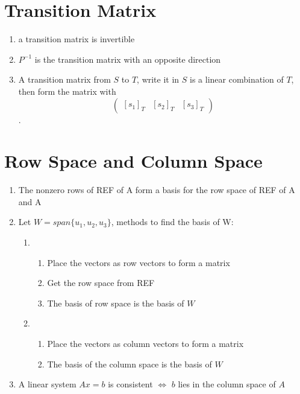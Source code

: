 \documentclass{article}
\begin{document}
\section*{Transition Matrix}
\begin{enumerate}
\item a transition matrix is invertible
\item $P^{-1}$ is the transition matrix with an opposite direction
\item A transition matrix from $S$ to $T$, write it in $S$ is a linear combination of $T$, then form the matrix with \\
$$\begin{pmatrix} [s_1]_T & [s_2]_T & [s_3]_T \end{pmatrix}$$.
\end{enumerate}

\section*{Row Space and Column Space}
\begin{enumerate}
\item The nonzero rows of REF of A form a basis for the row space of REF of A and A
\item Let $W = span\{u_1, u_2, u_3\}$, methods to find the basis of W:
\begin{enumerate}
    \item \begin{enumerate}
        \item Place the vectors as row vectors to form a matrix
        \item Get the row space from REF
        \item The basis of row space is the basis of $W$
    \end{enumerate}
    \item \begin{enumerate}
        \item Place the vectors as column vectors to form a matrix
        \item The basis of the column space is the basis of $W$
        \end{enumerate}
\end{enumerate}
\item A linear system $Ax = b$ is consistent $\Leftrightarrow$ $b$ lies in the column space of $A$
\end{enumerate}
\end{document}
